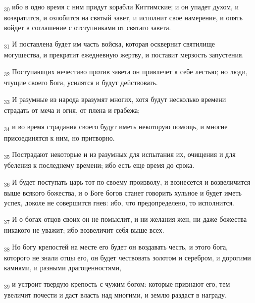 \begin{tcolorbox}
\textsubscript{30} ибо в одно время с ним придут корабли Киттимские; и он упадет духом, и возвратится, и озлобится на святый завет, и исполнит свое намерение, и опять войдет в соглашение с отступниками от святаго завета.
\end{tcolorbox}
\begin{tcolorbox}
\textsubscript{31} И поставлена будет им часть войска, которая осквернит святилище могущества, и прекратит ежедневную жертву, и поставит мерзость запустения.
\end{tcolorbox}
\begin{tcolorbox}
\textsubscript{32} Поступающих нечестиво против завета он привлечет к себе лестью; но люди, чтущие своего Бога, усилятся и будут действовать.
\end{tcolorbox}
\begin{tcolorbox}
\textsubscript{33} И разумные из народа вразумят многих, хотя будут несколько времени страдать от меча и огня, от плена и грабежа;
\end{tcolorbox}
\begin{tcolorbox}
\textsubscript{34} и во время страдания своего будут иметь некоторую помощь, и многие присоединятся к ним, но притворно.
\end{tcolorbox}
\begin{tcolorbox}
\textsubscript{35} Пострадают некоторые и из разумных для испытания их, очищения и для убеления к последнему времени; ибо есть еще время до срока.
\end{tcolorbox}
\begin{tcolorbox}
\textsubscript{36} И будет поступать царь тот по своему произволу, и вознесется и возвеличится выше всякого божества, и о Боге богов станет говорить хульное и будет иметь успех, доколе не совершится гнев: ибо, что предопределено, то исполнится.
\end{tcolorbox}
\begin{tcolorbox}
\textsubscript{37} И о богах отцов своих он не помыслит, и ни желания жен, ни даже божества никакого не уважит; ибо возвеличит себя выше всех.
\end{tcolorbox}
\begin{tcolorbox}
\textsubscript{38} Но богу крепостей на месте его будет он воздавать честь, и этого бога, которого не знали отцы его, он будет чествовать золотом и серебром, и дорогими камнями, и разными драгоценностями,
\end{tcolorbox}
\begin{tcolorbox}
\textsubscript{39} и устроит твердую крепость с чужим богом: которые признают его, тем увеличит почести и даст власть над многими, и землю раздаст в награду.
\end{tcolorbox}
